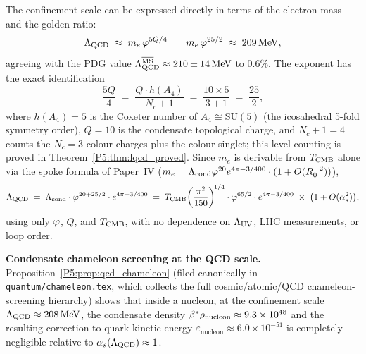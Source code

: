 \begin{remark}
\label{P5:rem:lqcd_me_phi}
The confinement scale can be expressed directly in terms of the
electron mass and the golden ratio:
\begin{equation}
  \Lambda_{\mathrm{QCD}} \;\approx\; m_e\,\varphi^{5Q/4} \;=\; m_e\,\varphi^{25/2} \;\approx\; 209\,\mathrm{MeV},
  \label{P5:eq:lqcd_me_phi}
\end{equation}
agreeing with the PDG value $\Lambda_{\mathrm{QCD}}^{\overline{\mathrm{MS}}}\approx210\pm14\,\mathrm{MeV}$
to $0.6\%$. The exponent has the exact identification
\begin{equation}
  \frac{5Q}{4} \;=\; \frac{Q\cdot h(A_4)}{N_c+1} \;=\; \frac{10\times5}{3+1} \;=\; \frac{25}{2},
  \label{P5:eq:5Q4_identity}
\end{equation}
where $h(A_4)=5$ is the Coxeter number of $A_4\cong\mathrm{SU}(5)$
(the icosahedral 5-fold symmetry order), $Q=10$ is the condensate
topological charge, and $N_c+1=4$ counts the $N_c=3$ colour charges
plus the colour singlet; this level-counting is proved in
Theorem~\ref{P5:thm:lqcd_proved}.
Since $m_e$ is derivable from $T_{\mathrm{CMB}}$ alone via the spoke formula of
Paper~IV ($m_e=\Lambda_{\mathrm{cond}}\varphi^{20}e^{4\pi-3/400}\cdot(1+O(R_0^{-2}))$),
\begin{equation}
  \Lambda_{\mathrm{QCD}}
  \;=\; \Lambda_{\mathrm{cond}}\cdot\varphi^{20+25/2}\cdot e^{4\pi-3/400}
  \;=\; T_{\mathrm{CMB}}\!\left(\frac{\pi^2}{150}\right)^{\!1/4}
        \cdot\varphi^{65/2}\cdot e^{4\pi-3/400}
  \;\times\;\bigl(1+O(\alpha_s^2)\bigr),
  \label{P5:eq:lqcd_single_input}
\end{equation}
using only $\varphi$, $Q$, and $T_{\mathrm{CMB}}$, with no dependence on $\Lambda_{\mathrm{UV}}$, LHC
measurements, or loop order.
\end{remark}

\noindent\textbf{Condensate chameleon screening at the QCD scale.}
Proposition~\ref{P5:prop:qcd_chameleon} (filed canonically in
\texttt{quantum/chameleon.tex}, which collects the full cosmic/atomic/QCD
chameleon-screening hierarchy) shows that inside a nucleon, at the
confinement scale $\Lambda_{\mathrm{QCD}}\approx208\,\mathrm{MeV}$, the condensate density
$\beta^{*}\rho_{\mathrm{nucleon}}\approx9.3\times10^{48}$ and the resulting
correction to quark kinetic energy $\varepsilon_{\mathrm{nucleon}}\approx6.0\times10^{-51}$
is completely negligible relative to $\alpha_s(\Lambda_{\mathrm{QCD}})\approx1$.

